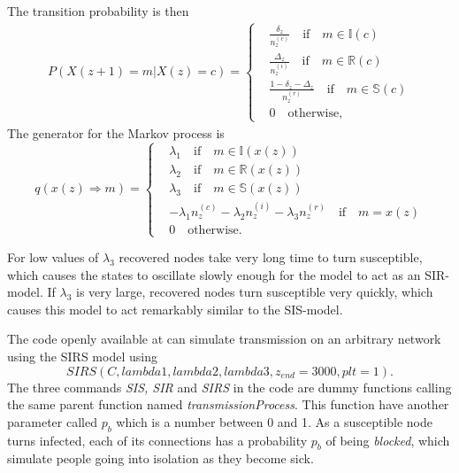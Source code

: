 \documentclass[12pt]{article} %
\numberwithin{equation}{section}
\begin{document}
The transition probability is then
\begin{equation} \label{firstPSIRS}
\begin{split}
P(X(z+1) = m |X(z)= c) =
\begin{cases}
& \frac{\delta_z}{n_z^{(c)}}  \quad \text{if} \quad m \in \mathbb{I}(c) \\
& \frac{\Delta_z}{n_z^{(i)}}  \quad \text{if} \quad m \in \mathbb{R}(c) \\
& \frac{1-\delta_z-\Delta_z}{n_z^{(r)}}  \quad \text{if} \quad m \in \mathbb{S}(c) \\
& 0 \quad \text{otherwise,}
\end{cases}
\end{split}
\end{equation}
The generator for the Markov process is
\begin{equation}\label{qSIRS}
    q(x(z)\Rightarrow m) = 
    \begin{cases}
    & \lambda_1 \quad \text{if} \quad m \in \mathbb{I}(x(z)) \\
    & \lambda_2 \quad \text{if} \quad m \in \mathbb{R}(x(z)) \\
    & \lambda_3 \quad \text{if} \quad m \in \mathbb{S}(x(z)) \\
    & -\lambda_1n_z^{(c)}-\lambda_2n_z^{(i)}-\lambda_3n_z^{(r)}   \quad \text{if} \quad m = x(z)\\
    & 0 \quad \text{otherwise.}
    \end{cases}
\end{equation}

For low values of $\lambda_3$ recovered nodes take very long time to turn susceptible, which causes the states to oscillate slowly enough for the model to act as an SIR-model. If $\lambda_3$ is very large, recovered nodes turn susceptible very quickly, which causes this model to act remarkably similar to the SIS-model. 

The code openly available at \cite{github} can simulate transmission on an arbitrary network using the SIRS model using $$SIRS(C,lambda1,lambda2,lambda3,z_{end} = 3000,plt=1).$$
The three commands \textit{SIS, SIR} and \textit{SIRS} in the code are dummy functions calling the same parent function named \textit{transmissionProcess}. This function have another parameter called $p_b$ which is a number between 0 and 1. As a susceptible node turns infected, each of its connections has a probability $p_b$ of being \textit{blocked}, which simulate people going into isolation as they become sick.

{}

\end{document}
